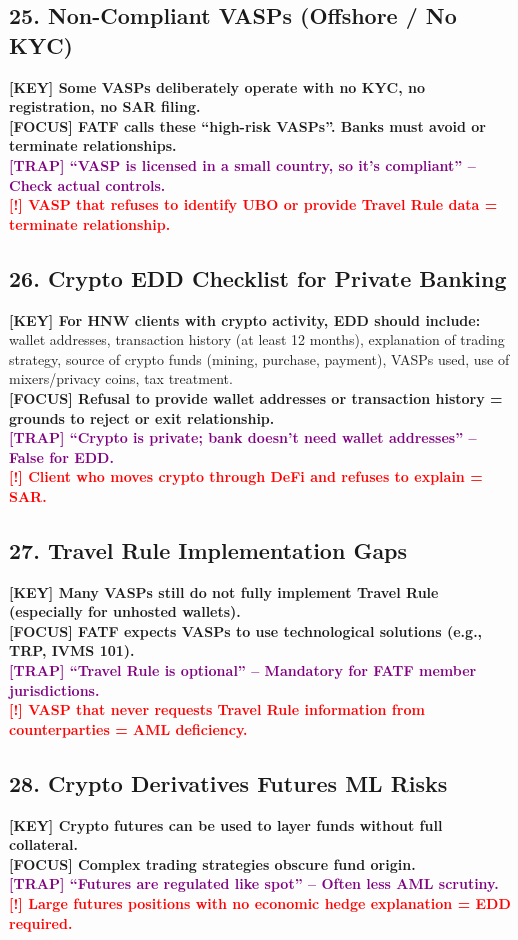 \documentclass[10pt,a4paper]{article}
\newcommand{\redflag}[1]{\textcolor{red}{\textbf{[!] #1}}}
\newcommand{\examfocus}[1]{\textcolor{orange!80!black}{\textbf{[FOCUS] #1}}}
\newcommand{\trap}[1]{\textcolor{purple}{\textbf{[TRAP] #1}}}
\newcommand{\keyterm}[1]{\textcolor{red!80!black}{\textbf{[KEY] #1}}}
\begin{document}
\subsection*{25. Non-Compliant VASPs (Offshore / No KYC)}
\keyterm{Some VASPs deliberately operate with no KYC, no registration, no SAR filing.} \\
\examfocus{FATF calls these “high-risk VASPs”. Banks must avoid or terminate relationships.} \\
\trap{“VASP is licensed in a small country, so it's compliant” – Check actual controls.} \\
\redflag{VASP that refuses to identify UBO or provide Travel Rule data = terminate relationship.}

\subsection*{26. Crypto EDD Checklist for Private Banking}
\keyterm{For HNW clients with crypto activity, EDD should include:} wallet addresses, transaction history (at least 12 months), explanation of trading strategy, source of crypto funds (mining, purchase, payment), VASPs used, use of mixers/privacy coins, tax treatment. \\
\examfocus{Refusal to provide wallet addresses or transaction history = grounds to reject or exit relationship.} \\
\trap{“Crypto is private; bank doesn't need wallet addresses” – False for EDD.} \\
\redflag{Client who moves crypto through DeFi and refuses to explain = SAR.}

\subsection*{27. Travel Rule Implementation Gaps}
\keyterm{Many VASPs still do not fully implement Travel Rule (especially for unhosted wallets).} \\
\examfocus{FATF expects VASPs to use technological solutions (e.g., TRP, IVMS 101).} \\
\trap{“Travel Rule is optional” – Mandatory for FATF member jurisdictions.} \\
\redflag{VASP that never requests Travel Rule information from counterparties = AML deficiency.}

\subsection*{28. Crypto Derivatives \/ Futures ML Risks}
\keyterm{Crypto futures can be used to layer funds without full collateral.} \\
\examfocus{Complex trading strategies obscure fund origin.} \\
\trap{“Futures are regulated like spot” – Often less AML scrutiny.} \\
\redflag{Large futures positions with no economic hedge explanation = EDD required.}
\end{document}
